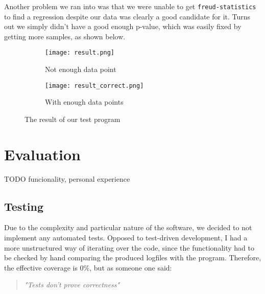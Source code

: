         Another problem we ran into was that we were unable to get \texttt{freud-statistics} to find a
        regression despite our data was clearly a good candidate for it. Turns out we simply didn't have a
        good enough p-value, which was easily fixed by getting more samples, as shown below.

        \begin{figure}[H]
            \centering
            \begin{subfigure}[b]{0.49\textwidth}
                \texttt{[image: result.png]}
                \caption{Not enough data point}
                \label{fig:result1}
            \end{subfigure}
            \hfill
            \begin{subfigure}[b]{0.49\textwidth}
                \texttt{[image: result\_correct.png]}
                \caption{With enough data points}
                \label{fig:result2}
            \end{subfigure}
            \caption{The result of our test program}
            \label{fig:fullresult}
        \end{figure}


\chapter{Evaluation}


    TODO funcionality, personal experience


    \section{Testing}

        Due to the complexity and particular nature of the software, we decided to not implement any automated
        tests. Opposed to test-driven development, I had a more unstructured way of iterating over the code,
        since the functionality had to be checked by hand comparing the produced logfiles with the program.
        Therefore, the effective coverage is 0\%, but as someone one said:\\

        \begin{quote} 
            \centering 
            \textit{"Tests don't prove correctness"}
        \end{quote}


